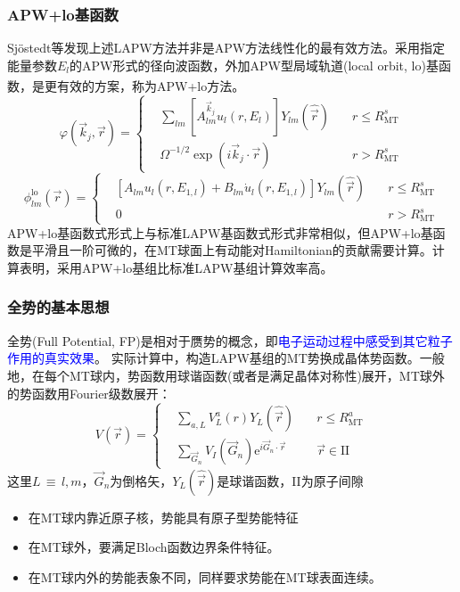 \documentclass[cjk,slidestop,compress,mathserif,blue]{beamer}
\newcommand{\upcite}[1]{\hspace{0ex}\textsuperscript{\cite{#1}}} %
\begin{document}
\frame
{
\frametitle{\textrm{APW+lo}基函数}
\textrm{Sj\"ostedt}等发现上述\textrm{LAPW}方法并非是\textrm{APW}方法线性化的最有效方法。采用指定能量参数$E_l$的\textrm{APW}形式的径向波函数，外加\textrm{APW}型局域轨道(\textrm{local orbit, lo})基函数，是更有效的方案，称为\textrm{APW+lo}方法\upcite{SSC114-15_2000}。
$$  \varphi(\vec k_j,\vec r)=\left\{
  \begin{aligned}
    &\sum_{lm}[A^{\vec k_j}_{lm}u_l(r,E_l)]Y_{lm}(\hat{\vec r})\quad&r\leqslant R_{\mathrm{MT}}^s\\
    &\Omega^{-1/2}\exp(i\vec k_j\cdot\vec r) &r>R_{\mathrm{MT}}^s
  \end{aligned}\right.
  \label{eq:APW-basis}
$$
$$  \phi_{lm}^{\mathrm{lo}}(\vec r)=\left\{
  \begin{aligned}
  &[A_{lm}u_l(r,E_{1,l})+B_{lm}\dot u_l(r,E_{1,l})]Y_{lm}(\hat{\vec r})\quad&r\leqslant R_{\mathrm{MT}}^s\\
  &0&r>R_{\mathrm{MT}}^s
  \end{aligned}
\right.$$
\textrm{APW+lo}基函数式形式上与标准\textrm{LAPW}基函数式形式非常相似，但\textrm{APW+lo}基函数是平滑且一阶可微的，在\textrm{MT}球面上有动能对\textrm{Hamiltonian}的贡献需要计算。计算表明，采用\textrm{APW+lo}基组比标准\textrm{LAPW}基组计算效率高。
}

\frame
{
\frametitle{全势的基本思想}
全势\textrm{(Full Potential, FP)}是相对于赝势的概念，即\textcolor{blue}{电子运动过程中感受到其它粒子作用的真实效果}。
实际计算中，构造\textrm{LAPW}基组的\textrm{MT}势换成晶体势函数。一般地，在每个\textrm{MT}球内，势函数用球谐函数(或者是满足晶体对称性)展开，\textrm{MT}球外的势函数用\textrm{Fourier}级数展开：%
{\footnotesize$$ V(\vec r)=\left\{
  \begin{aligned}
    &\sum_{a,L}V_L^a(r)Y_L(\hat{\vec r})\quad &r\leqslant R_{\mathrm{MT}}^a\\
    &\sum_{\vec G_n}V_I(\vec G_n)\textrm{e}^{i\vec G_n\cdot\vec r} &\vec r\in\mathrm{II}
  \end{aligned}\right.
  \label{eq:solid-63}
$$}
这里$L$\,$\equiv$\,$l,m$，$\vec G_n$为倒格矢，$Y_L(\hat{\vec r})$是球谐函数，\textrm{II}为原子间隙
\begin{itemize}
	\item 在\textrm{MT}球内靠近原子核，势能具有原子型势能特征
	\item 在\textrm{MT}球外，要满足\textrm{Bloch}函数边界条件特征。
	\item 在\textrm{MT}球内外的势能表象不同，同样要求势能在\textrm{MT}球表面连续。
\end{itemize}
}
\end{document}
